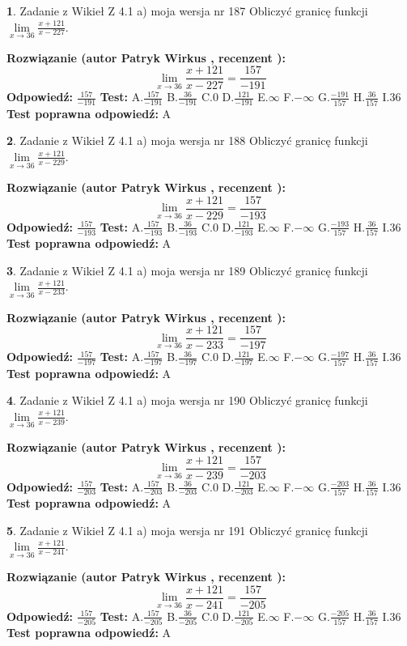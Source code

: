 \documentclass[12pt, a4paper]{article}
\theoremstyle{definition} %
\newtheorem{zad}{}
\newcommand{\zadStart}[1]{\begin{zad}#1\newline}
\newcommand{\zadStop}{\end{zad}}
\newcommand{\rozwStart}[2]{\noindent \textbf{Rozwiązanie (autor #1 , recenzent #2): }\newline}
\newcommand{\rozwStop}{\newline}
\newcommand{\odpStart}{\noindent \textbf{Odpowiedź:}\newline}
\newcommand{\odpStop}{\newline}
\newcommand{\testStart}{\noindent \textbf{Test:}\newline}
\newcommand{\testStop}{\newline}
\newcommand{\kluczStart}{\noindent \textbf{Test poprawna odpowiedź:}\newline}
\newcommand{\kluczStop}{\newline}
\begin{document}
\zadStart{Zadanie z Wikieł Z 4.1 a) moja wersja nr 187}
Obliczyć granicę funkcji $\lim\limits_{x\to36}\frac{x+121}{x-227}$.
\zadStop
\rozwStart{Patryk Wirkus}{}
$$\lim\limits_{x\to36}\frac{x+121}{x-227} = \frac{157}{-191}$$
\rozwStop
\odpStart
$\frac{157}{-191}$
\odpStop
\testStart
A.$\frac{157}{-191}$
B.$\frac{36}{-191}$
C.$0$
D.$\frac{121}{-191}$
E.$\infty$
F.$-\infty$
G.$\frac{-191}{157}$
H.$\frac{36}{157}$
I.$36$
\testStop
\kluczStart
A
\kluczStop



\zadStart{Zadanie z Wikieł Z 4.1 a) moja wersja nr 188}
Obliczyć granicę funkcji $\lim\limits_{x\to36}\frac{x+121}{x-229}$.
\zadStop
\rozwStart{Patryk Wirkus}{}
$$\lim\limits_{x\to36}\frac{x+121}{x-229} = \frac{157}{-193}$$
\rozwStop
\odpStart
$\frac{157}{-193}$
\odpStop
\testStart
A.$\frac{157}{-193}$
B.$\frac{36}{-193}$
C.$0$
D.$\frac{121}{-193}$
E.$\infty$
F.$-\infty$
G.$\frac{-193}{157}$
H.$\frac{36}{157}$
I.$36$
\testStop
\kluczStart
A
\kluczStop



\zadStart{Zadanie z Wikieł Z 4.1 a) moja wersja nr 189}
Obliczyć granicę funkcji $\lim\limits_{x\to36}\frac{x+121}{x-233}$.
\zadStop
\rozwStart{Patryk Wirkus}{}
$$\lim\limits_{x\to36}\frac{x+121}{x-233} = \frac{157}{-197}$$
\rozwStop
\odpStart
$\frac{157}{-197}$
\odpStop
\testStart
A.$\frac{157}{-197}$
B.$\frac{36}{-197}$
C.$0$
D.$\frac{121}{-197}$
E.$\infty$
F.$-\infty$
G.$\frac{-197}{157}$
H.$\frac{36}{157}$
I.$36$
\testStop
\kluczStart
A
\kluczStop



\zadStart{Zadanie z Wikieł Z 4.1 a) moja wersja nr 190}
Obliczyć granicę funkcji $\lim\limits_{x\to36}\frac{x+121}{x-239}$.
\zadStop
\rozwStart{Patryk Wirkus}{}
$$\lim\limits_{x\to36}\frac{x+121}{x-239} = \frac{157}{-203}$$
\rozwStop
\odpStart
$\frac{157}{-203}$
\odpStop
\testStart
A.$\frac{157}{-203}$
B.$\frac{36}{-203}$
C.$0$
D.$\frac{121}{-203}$
E.$\infty$
F.$-\infty$
G.$\frac{-203}{157}$
H.$\frac{36}{157}$
I.$36$
\testStop
\kluczStart
A
\kluczStop



\zadStart{Zadanie z Wikieł Z 4.1 a) moja wersja nr 191}
Obliczyć granicę funkcji $\lim\limits_{x\to36}\frac{x+121}{x-241}$.
\zadStop
\rozwStart{Patryk Wirkus}{}
$$\lim\limits_{x\to36}\frac{x+121}{x-241} = \frac{157}{-205}$$
\rozwStop
\odpStart
$\frac{157}{-205}$
\odpStop
\testStart
A.$\frac{157}{-205}$
B.$\frac{36}{-205}$
C.$0$
D.$\frac{121}{-205}$
E.$\infty$
F.$-\infty$
G.$\frac{-205}{157}$
H.$\frac{36}{157}$
I.$36$
\testStop
\kluczStart
A
\kluczStop
\end{document}
